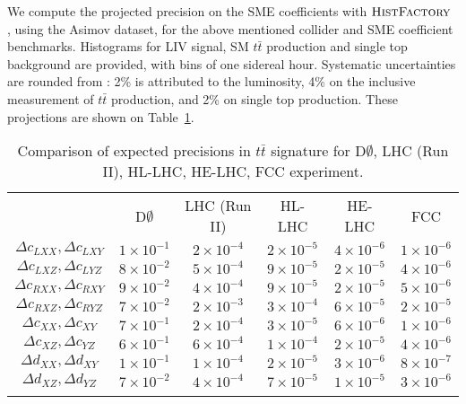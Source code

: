 \documentclass[a4paper,11pt,twoside,french]{article}
\begin{document}
We compute the projected precision on the SME coefficients with $\mbox{\textsc{HistFactory}}$ \cite{Cranmer:2012sba}, using the Asimov dataset, for the above mentioned collider and SME coefficient benchmarks. Histograms for LIV signal, SM $t\bar{t}$ production and single top background are provided, with bins of one sidereal hour. Systematic uncertainties are rounded from \cite{Khachatryan:2016kzg}: 2\% is attributed to the luminosity, 4\% on the inclusive measurement of $t\bar{t}$ production, and 2\% on single top production. These projections are shown on Table~\ref{tab:1}.
\begin{table}[h!]
	\caption{Comparison of expected precisions in $t\bar{t}$ signature for D$\emptyset$, LHC (Run II), HL-LHC, HE-LHC, FCC experiment.}
	\label{tab:1}       %
	\begin{tabular}{cccccc}
		\hline\noalign{\smallskip}
		 &  D$\emptyset$  & LHC (Run II)  & HL-LHC  & HE-LHC & FCC\\
		\noalign{\smallskip}\hline\noalign{\smallskip}
		$\Delta c_{LXX} , \Delta c_{LXY}$ & $1\times 10^{-1}$  & $2\times 10^{-4}$ & $2\times 10^{-5}$ & $4\times 10^{-6}$ & $1\times 10^{-6}$ \\
		$\Delta c_{LXZ} , \Delta c_{LYZ}$ & $8\times 10^{-2}$ & $5\times 10^{-4}$ & $9\times 10^{-5}$ & $2\times 10^{-5}$ & $4\times 10^{-6}$ \\
		\noalign{\smallskip}\hline\noalign{\smallskip}
		$\Delta c_{RXX} , \Delta c_{RXY}$ & $9\times 10^{-2}$  & $4\times 10^{-4}$ & $9\times 10^{-5}$ & $2\times 10^{-5}$ & $5\times 10^{-6}$ \\
		$\Delta c_{RXZ} , \Delta c_{RYZ}$ & $7\times 10^{-2}$ & $2\times 10^{-3}$ & $3\times 10^{-4}$ & $6\times 10^{-5}$ & $2\times 10^{-5}$ \\
		\noalign{\smallskip}\hline\noalign{\smallskip}
		$\Delta c_{XX} , \Delta c_{XY}$ & $7\times 10^{-1}$  & $2\times 10^{-4}$ & $3\times 10^{-5}$ & $6\times 10^{-6}$ & $1\times 10^{-6}$ \\
		$\Delta c_{XZ} , \Delta c_{YZ}$ & $6\times 10^{-1}$ & $6\times 10^{-4}$ & $1\times 10^{-4}$ & $2\times 10^{-5}$ & $4\times 10^{-6}$ \\
		\noalign{\smallskip}\hline\noalign{\smallskip}
		$\Delta d_{XX} , \Delta d_{XY}$ & $1\times 10^{-1}$  & $1\times 10^{-4}$ & $2\times 10^{-5}$ & $3\times 10^{-6}$ & $8\times 10^{-7}$ \\
		$\Delta d_{XZ} , \Delta d_{YZ}$ & $7\times 10^{-2}$ & $4\times 10^{-4}$ & $7\times 10^{-5}$ & $1\times 10^{-5}$ & $3\times 10^{-6}$ \\
		\noalign{\smallskip}\hline
	\end{tabular}
\end{table}
\end{document}
